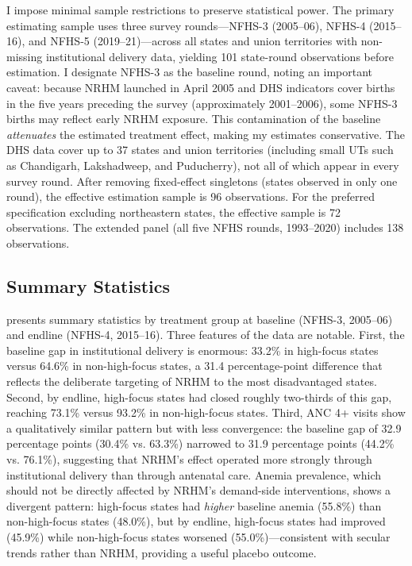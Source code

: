 \documentclass[12pt]{article}
\begin{document}
I impose minimal sample restrictions to preserve statistical power. The primary estimating sample uses three survey rounds---NFHS-3 (2005--06), NFHS-4 (2015--16), and NFHS-5 (2019--21)---across all states and union territories with non-missing institutional delivery data, yielding 101 state-round observations before estimation. I designate NFHS-3 as the baseline round, noting an important caveat: because NRHM launched in April 2005 and DHS indicators cover births in the five years preceding the survey (approximately 2001--2006), some NFHS-3 births may reflect early NRHM exposure. This contamination of the baseline \emph{attenuates} the estimated treatment effect, making my estimates conservative. The DHS data cover up to 37 states and union territories (including small UTs such as Chandigarh, Lakshadweep, and Puducherry), not all of which appear in every survey round. After removing fixed-effect singletons (states observed in only one round), the effective estimation sample is 96 observations. For the preferred specification excluding northeastern states, the effective sample is 72 observations. The extended panel (all five NFHS rounds, 1993--2020) includes 138 observations.

\subsection{Summary Statistics}



 presents summary statistics by treatment group at baseline (NFHS-3, 2005--06) and endline (NFHS-4, 2015--16). Three features of the data are notable. First, the baseline gap in institutional delivery is enormous: 33.2\% in high-focus states versus 64.6\% in non-high-focus states, a 31.4 percentage-point difference that reflects the deliberate targeting of NRHM to the most disadvantaged states. Second, by endline, high-focus states had closed roughly two-thirds of this gap, reaching 73.1\% versus 93.2\% in non-high-focus states. Third, ANC 4+ visits show a qualitatively similar pattern but with less convergence: the baseline gap of 32.9 percentage points (30.4\% vs. 63.3\%) narrowed to 31.9 percentage points (44.2\% vs. 76.1\%), suggesting that NRHM's effect operated more strongly through institutional delivery than through antenatal care. Anemia prevalence, which should not be directly affected by NRHM's demand-side interventions, shows a divergent pattern: high-focus states had \emph{higher} baseline anemia (55.8\%) than non-high-focus states (48.0\%), but by endline, high-focus states had improved (45.9\%) while non-high-focus states worsened (55.0\%)---consistent with secular trends rather than NRHM, providing a useful placebo outcome.
\end{document}

